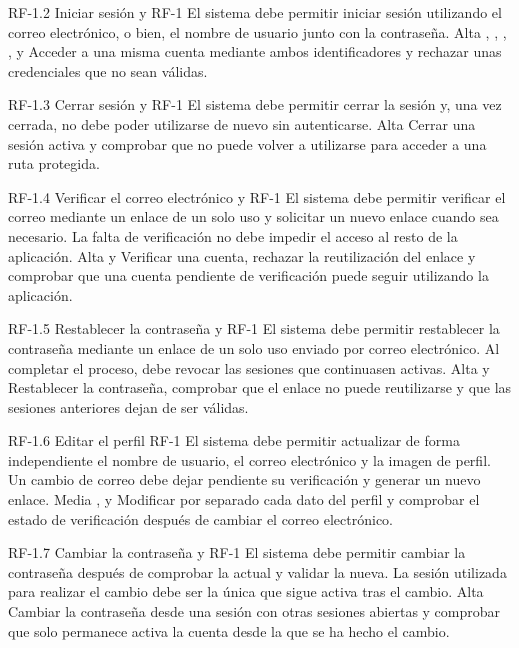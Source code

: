 \requisitoFuncional
{RF-1.2}
{Iniciar sesión}
{ y }
{RF-1}
{El sistema debe permitir iniciar sesión utilizando el correo
electrónico, o bien, el nombre de usuario junto con la contraseña.}
{Alta}
{, , ,
,  y }
{Acceder a una misma cuenta mediante ambos identificadores y rechazar unas
credenciales que no sean válidas.}

\requisitoFuncional
{RF-1.3}
{Cerrar sesión}
{ y }
{RF-1}
{El sistema debe permitir cerrar la sesión y, una vez cerrada, no debe
poder utilizarse de nuevo sin autenticarse.}
{Alta}
{}
{Cerrar una sesión activa y comprobar que no puede volver a utilizarse para
acceder a una ruta protegida.}

\requisitoFuncional
{RF-1.4}
{Verificar el correo electrónico}
{ y }
{RF-1}
{El sistema debe permitir verificar el correo mediante un enlace de un solo uso
y solicitar un nuevo enlace cuando sea necesario. La falta de verificación no
debe impedir el acceso al resto de la aplicación.}
{Alta}
{ y }
{Verificar una cuenta, rechazar la reutilización del enlace y comprobar que una
cuenta pendiente de verificación puede seguir utilizando la aplicación.}

\requisitoFuncional
{RF-1.5}
{Restablecer la contraseña}
{ y }
{RF-1}
{El sistema debe permitir restablecer la contraseña mediante un enlace de un
solo uso enviado por correo electrónico. Al completar el proceso, debe revocar
las sesiones que continuasen activas.}
{Alta}
{ y }
{Restablecer la contraseña, comprobar que el enlace no puede reutilizarse y que
las sesiones anteriores dejan de ser válidas.}

\requisitoFuncional
{RF-1.6}
{Editar el perfil}
{}
{RF-1}
{El sistema debe permitir actualizar de forma independiente el nombre de
usuario, el correo electrónico y la imagen de perfil. Un cambio de correo debe
dejar pendiente su verificación y generar un nuevo enlace.}
{Media}
{,  y }
{Modificar por separado cada dato del perfil y comprobar el estado de
verificación después de cambiar el correo electrónico.}

\requisitoFuncional
{RF-1.7}
{Cambiar la contraseña}
{ y }
{RF-1}
{El sistema debe permitir cambiar la contraseña después de comprobar la actual
y validar la nueva. La sesión utilizada para realizar el cambio debe ser la única
que sigue activa tras el cambio.}
{Alta}
{}
{Cambiar la contraseña desde una sesión con otras sesiones abiertas y comprobar
que solo permanece activa la cuenta desde la que se ha hecho el cambio.}


